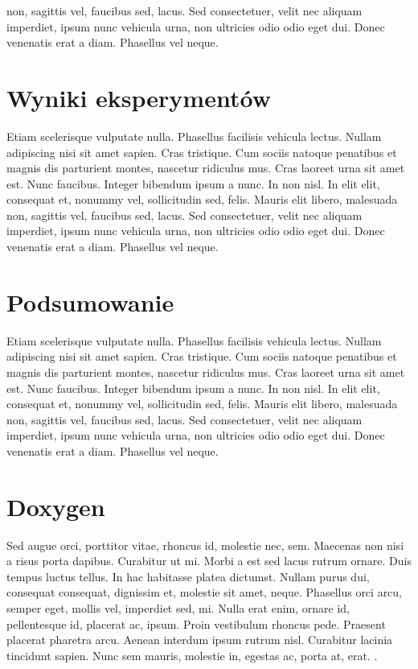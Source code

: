 \documentclass[eng,printmode]{mgr}
\begin{document}
 non, sagittis vel, faucibus sed, lacus. Sed consectetuer, velit nec aliquam imperdiet, ipsum nunc vehicula urna, non ultricies odio odio eget dui. Donec venenatis erat a diam. Phasellus vel neque.

\chapter{Wyniki eksperymentów}

Etiam scelerisque vulputate nulla. Phasellus facilisis vehicula lectus. Nullam adipiscing nisi sit amet sapien. Cras tristique. Cum sociis natoque penatibus et magnis dis parturient montes, nascetur ridiculus mus. Cras laoreet urna sit amet est. Nunc faucibus. Integer bibendum ipsum a nunc. In non nisl. In elit elit, consequat et, nonummy vel, sollicitudin sed, felis. Mauris elit libero, malesuada non, sagittis vel, faucibus sed, lacus. Sed consectetuer, velit nec aliquam imperdiet, ipsum nunc vehicula urna, non ultricies odio odio eget dui. Donec venenatis erat a diam. Phasellus vel neque.

\chapter{Podsumowanie}
Etiam scelerisque vulputate nulla. Phasellus facilisis vehicula lectus. Nullam adipiscing nisi sit amet sapien. Cras tristique. Cum sociis natoque penatibus et magnis dis parturient montes, nascetur ridiculus mus. Cras laoreet urna sit amet est. Nunc faucibus. Integer bibendum ipsum a nunc. In non nisl. In elit elit, consequat et, nonummy vel, sollicitudin sed, felis. Mauris elit libero, malesuada non, sagittis vel, faucibus sed, lacus. Sed consectetuer, velit nec aliquam imperdiet, ipsum nunc vehicula urna, non ultricies odio odio eget dui. Donec venenatis erat a diam. Phasellus vel neque.

\appendix
\chapter{Doxygen}

Sed augue orci, porttitor vitae, rhoncus id, molestie nec, sem. Maecenas non nisi a risus porta dapibus. Curabitur ut mi. Morbi a est sed lacus rutrum ornare. Duis tempus luctus tellus. In hac habitasse platea dictumst. Nullam purus dui, consequat consequat, dignissim et, molestie sit amet, neque. Phasellus orci arcu, semper eget, mollis vel, imperdiet sed, mi. Nulla erat enim, ornare id, pellentesque id, placerat ac, ipsum. Proin vestibulum rhoncus pede. Praesent placerat pharetra arcu. Aenean interdum ipsum rutrum nisl. Curabitur lacinia tincidunt sapien. Nunc sem mauris, molestie in, egestas ac, porta at, erat.
.
\end{document}
